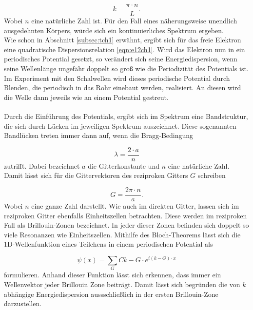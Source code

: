 \begin{equation}
  \label{eqn:e1ch4}
  k = \frac{\pi \cdot n}{L}.
\end{equation}
Wobei $n$ eine natürliche Zahl ist. Für den Fall eines näherungsweise unendlich ausgedehnten Körpers,
würde sich ein kontinuierliches Spektrum ergeben.\\
Wie schon in Abschnitt \ref{subsec:tch1} erwähnt, ergibt sich für das freie Elektron eine quadratische
Dispersionsrelation \eqref{eqn:e12ch1}. Wird das Elektron nun in ein periodisches Potential gesetzt,
so verändert sich seine Energiedispersion, wenn seine Wellenlänge ungefähr doppelt so groß wie die
Periodizität des Potentials ist.\\
Im Experiment mit den Schalwellen wird dieses periodische Potential durch Blenden, die periodisch in
das Rohr einebaut werden, realisiert. An diesen wird die Welle dann jeweils wie an einem Potential gestreut.\\ \\
Durch die Einführung des Potentials, ergibt sich im Spektrum eine Bandstruktur, die sich durch Lücken im jeweiligen
Spektrum auszeichnet.
Diese sogenannten Bandlücken treten immer dann auf, wenn die Bragg-Bedingung

\begin{equation}
  \label{eqn:e2ch4}
  \lambda = \frac{2\cdot a}{n}
\end{equation}
zutrifft. Dabei bezeichnet $a$ die Gitterkonstante und $n$ eine natürliche Zahl. Damit lässt sich für die
Gittervektoren des reziproken Gitters $G$ schreiben

\begin{equation}
  \label{eqn:e3ch4}
  G = \frac{2\pi \cdot n}{a}.
\end{equation}
Wobei $n$ eine ganze Zahl darstellt.
Wie auch im direkten Gitter, lassen sich im reziproken Gitter ebenfalls Einheitszellen betrachten. Diese
werden im reziproken Fall als Brillouin-Zonen bezeichnet. In jeder dieser Zonen befinden sich doppelt so viele
Resonanzen wie Einheitszellen. Mithilfe des Bloch-Theorems lässt sich die 1D-Wellenfunktion eines Teilchens
in einem periodischen Potential als

\begin{equation}
  \label{eqn:e4ch4}
  \psi(x) = \sum_{G} C{k-G} \cdot e^{i\left( k - G \right)\cdot x}
\end{equation}
formulieren. Anhand dieser Funktion lässt sich erkennen, dass immer ein Wellenvektor jeder Brillouin Zone
beiträgt. Damit lässt sich begründen die von $k$ abhängige Energiedispersion aussschließlich in der ersten
Brillouin-Zone darzustellen.

